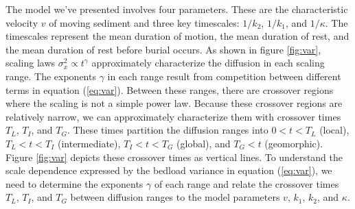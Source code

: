 \documentclass[draft,grl]{agujournal2018}
\begin{document}
The model we've presented involves four parameters. These are the characteristic velocity $v$ of moving sediment and three key timescales: $1/k_2$, $1/k_1$, and $1/\kappa$.
The timescales represent the mean duration of motion, the mean duration of rest, and the mean duration of rest before burial occurs.
As shown in figure \ref{fig:var}, scaling laws $\sigma_x^2 \propto t^\gamma$ approximately characterize the diffusion in each scaling range.
The exponents $\gamma$ in each range result from competition between different terms in equation (\ref{eq:var}).
Between these ranges, there are crossover regions where the scaling is not a simple power law.
Because these crossover regions are relatively narrow, we can approximately characterize them with crossover times $T_L$, $T_I$, and $T_G$.
These times partition the diffusion ranges into $0< t < T_L$ (local), $T_L < t < T_I$ (intermediate), $T_I < t < T_G$ (global), and $T_G < t$ (geomorphic). 
Figure \ref{fig:var} depicts these crossover times as vertical lines.
To understand the scale dependence expressed by the bedload variance in equation (\ref{eq:var}), we need to determine the exponents $\gamma$ of each range and relate the crossover times $T_L$, $T_I$, and $T_G$ between diffusion ranges to the model parameters $v$, $k_1$, $k_2$, and $\kappa$.
\end{document}
